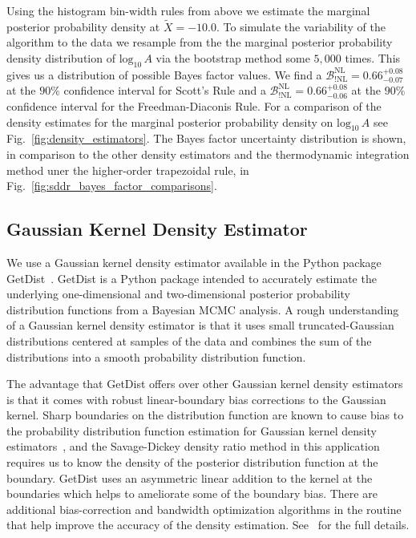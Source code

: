 Using the histogram bin-width rules from above we estimate the marginal posterior probability density at $\tilde{X} = -10.0$. To simulate the variability of the algorithm to the data we resample from the the marginal posterior probability density distribution of $\mathrm{log}_{10} \, A$ via the bootstrap method some $5,000$ times. This gives us a distribution of possible Bayes factor values. We find a $\mathcal{B}^{\mathrm{NL}}_{!\mathrm{NL}} = 0.66^{+0.08}_{-0.07}$ at the $90\%$ confidence interval for Scott's Rule and a $\mathcal{B}^{\mathrm{NL}}_{!\mathrm{NL}} = 0.66^{+0.08}_{-0.06}$ at the $90\%$ confidence interval for the Freedman-Diaconis Rule. For a comparison of the density estimates for the marginal posterior probability density on $\mathrm{log}_{10} \, A$ see Fig.~\ref{fig:density_estimators}. The Bayes factor uncertainty distribution is shown, in comparison to the other density estimators and the thermodynamic integration method uner the higher-order trapezoidal rule, in Fig.~\ref{fig:sddr_bayes_factor_comparisons}.

\subsection{Gaussian Kernel Density Estimator}
We use a Gaussian kernel density estimator available in the Python package GetDist~\citep{lewis2015getdist}. GetDist is a Python package intended to accurately estimate the underlying one-dimensional and two-dimensional posterior probability distribution functions from a Bayesian MCMC analysis. A rough understanding of a Gaussian kernel density estimator is that it uses small truncated-Gaussian distributions centered at samples of the data and combines the sum of the distributions into a smooth probability distribution function.

The advantage that GetDist offers over other Gaussian kernel density estimators is that it comes with robust linear-boundary bias corrections to the Gaussian kernel. Sharp boundaries on the distribution function are known to cause bias to the probability distribution function estimation for Gaussian kernel density estimators~\citep{lewis2015getdist}, and the Savage-Dickey density ratio method in this application requires us to know the density of the posterior distribution function at the boundary. GetDist uses an asymmetric linear addition to the kernel at the boundaries which helps to ameliorate some of the boundary bias. There are additional bias-correction and bandwidth optimization algorithms in the routine that help improve the accuracy of the density estimation. See~\cite{lewis2015getdist} for the full details.

